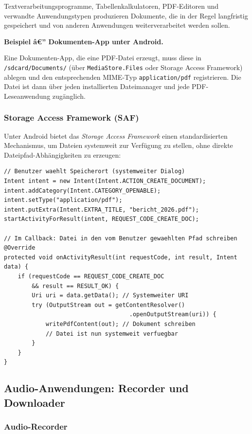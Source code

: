 ﻿\documentclass[12pt, a4paper]{article}
\begin{document}
Textverarbeitungsprogramme, Tabellenkalkulatoren, PDF-Editoren und verwandte
Anwendungstypen produzieren Dokumente, die in der Regel langfristig gespeichert und
von anderen Anwendungen weiterverarbeitet werden sollen.

\noindent\textbf{Beispiel â€” Dokumenten-App unter Android.}\par
Eine Dokumenten-App, die eine PDF-Datei erzeugt, muss diese in
\texttt{/sdcard/Documents/} (über \texttt{MediaStore.Files} oder Storage Access Framework)
ablegen und den entsprechenden MIME-Typ \texttt{application/pdf} registrieren.
Die Datei ist dann über jeden installierten Dateimanager und jede PDF-Leseanwendung
zugänglich.

\subsubsection{Storage Access Framework (SAF)}

Unter Android bietet das \emph{Storage Access Framework} einen standardisierten
Mechanismus, um Dateien systemweit zur Verfügung zu stellen, ohne direkte
Dateipfad-Abhängigkeiten zu erzeugen:

\begin{lstlisting}[style=android, caption={Dokument ueber SAF systemweit bereitstellen}]
// Benutzer waehlt Speicherort (systemweiter Dialog)
Intent intent = new Intent(Intent.ACTION_CREATE_DOCUMENT);
intent.addCategory(Intent.CATEGORY_OPENABLE);
intent.setType("application/pdf");
intent.putExtra(Intent.EXTRA_TITLE, "bericht_2026.pdf");
startActivityForResult(intent, REQUEST_CODE_CREATE_DOC);

// Im Callback: Datei in den vom Benutzer gewaehlten Pfad schreiben
@Override
protected void onActivityResult(int requestCode, int result, Intent data) {
    if (requestCode == REQUEST_CODE_CREATE_DOC
        && result == RESULT_OK) {
        Uri uri = data.getData(); // Systemweiter URI
        try (OutputStream out = getContentResolver()
                                    .openOutputStream(uri)) {
            writePdfContent(out); // Dokument schreiben
            // Datei ist nun systemweit verfuegbar
        }
    }
}
\end{lstlisting}

\subsection{Audio-Anwendungen: Recorder und Downloader}

\subsubsection{Audio-Recorder}
\end{document}

